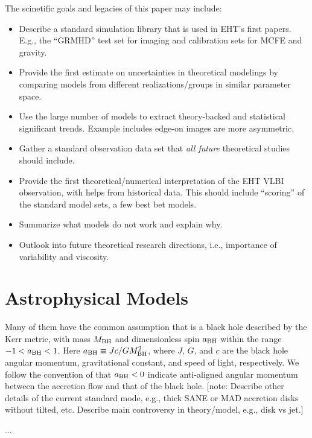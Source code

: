 \documentclass[twocolumn,twocolappendix,tighten,dvipsnames,linenumbers]{aastex63}
\newcommand\note[1]{{\color{OliveGreen}[note: #1]}}
\begin{document}
The scinetific goals and legacies of this paper may include:
\begin{itemize}
\item Describe a standard simulation library that is used in EHT's
  first \sgra papers.
  E.g., the ``GRMHD'' test set for imaging and calibration sets for
  MCFE and gravity.
\item Provide the first estimate on uncertainties in theoretical
  modelings by comparing models from different realizations/groups in
  similar parameter space.
\item Use the large number of models to extract theory-backed and
  statistical significant trends.
  Example includes edge-on images are more asymmetric.
\item Gather a standard observation data set that \emph{all future}
  theoretical studies should include.
\item Provide the first theoretical/numerical interpretation of the
  EHT \sgra VLBI observation, with helps from historical data.
  This should include ``scoring'' of the standard model sets, a few
  best bet models.
\item Summarize what models do not work and explain why.
\item Outlook into future theoretical research directions, i.e.,
  importance of variability and viscosity.
\end{itemize}

\clearpage

\section{Astrophysical Models}

Many of them have the common assumption that \sgra is a black hole
described by the Kerr metric, with mass $M_{\rm BH}$ and dimensionless spin
${a_{\rm BH}}$ within the range $-1 < {a_{\rm BH}} < 1$.
Here ${a_{\rm BH}} \equiv Jc/GM_{\rm BH}^2$, where $J$, $G$, and $c$ are the black
hole angular momentum, gravitational constant, and speed of light,
respectively.
We follow the convention of  that
${a_{\rm BH}} < 0$ indicate anti-aligned angular momentum between the
accretion flow and that of the black hole.
\note{Describe other details of the current standard \sgra mode, e.g.,
  thick SANE or MAD accretion disks without tilted, etc.
  Describe main controversy in theory/model, e.g., disk vs jet.}

...
\end{document}
